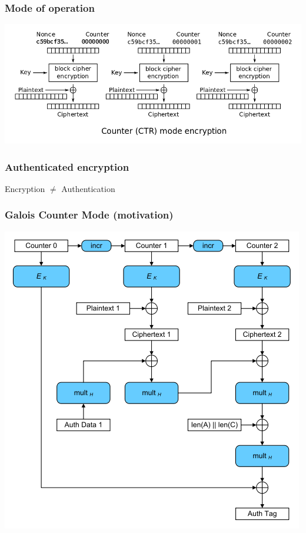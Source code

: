\documentclass{beamer}
\begin{document}
\begin{frame}
\frametitle{Mode of operation}
\begin{center}
\includegraphics[width=\textwidth]{mode-ctr.png}
\end{center}
\end{frame}

\begin{frame}
\frametitle{Authenticated encryption}
\begin{center}
Encryption $\neq$ Authentication
\end{center}
\end{frame}

\begin{frame}
\frametitle{Galois Counter Mode (motivation)}
\begin{center}
\includegraphics[height=0.7\textheight]{mode-gcm.png}
\end{center}
\end{frame}
\end{document}
